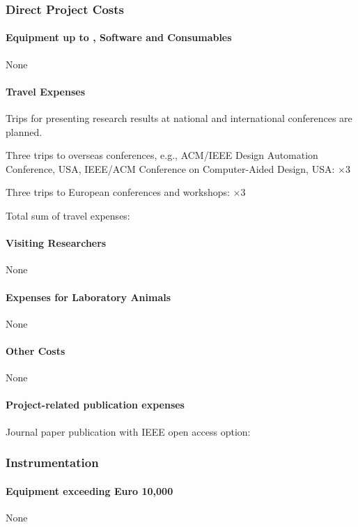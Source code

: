 \vskip 12pt
\subsubsection{Direct Project Costs}

\paragraph{Equipment up to , Software and Consumables}
None
\vskip 8pt

\paragraph{Travel Expenses} 
Trips for presenting research results at national and international
conferences are planned.

Three trips to overseas conferences, e.g., ACM/IEEE Design Automation
Conference, USA, IEEE/ACM Conference on Computer-Aided Design, USA:
$\times$3

Three trips to European conferences and workshops:
$\times$3

Total sum of travel expenses: 


\vskip 12pt
\paragraph{Visiting Researchers}
None
\vskip 8pt
\paragraph{Expenses for Laboratory Animals}
None
\vskip 8pt
\paragraph{Other Costs}
None
\vskip 8pt
\paragraph{Project-related publication expenses}
Journal paper publication with IEEE open access option: 

\vskip 12pt
\subsubsection{Instrumentation}
\paragraph{Equipment exceeding Euro 10,000}
None
\vskip 8pt

